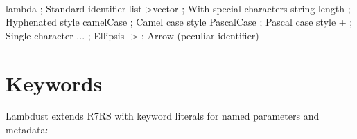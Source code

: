 \begin{grammar}
\\
\\
\\
\production{}{\alternative}{/ \alternative{} : \alternative{} < \alternative{} = \alternative{} >}{}
\\
\\
\\
\end{grammar}

\begin{example}
\begin{lambdustcode}
lambda          ; Standard identifier
list->vector    ; With special characters
string-length   ; Hyphenated style
camelCase       ; Camel case style  
PascalCase      ; Pascal case style
+               ; Single character
...             ; Ellipsis
->              ; Arrow (peculiar identifier)
\end{lambdustcode}
\end{example}

\section{Keywords}
\label{sec:keywords}

Lambdust extends R7RS with keyword literals for named parameters and metadata:

